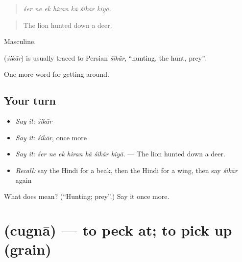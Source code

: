 \begin{quote}
      
\end{quote}

\begin{quote}
\emph{śer ne ek hiran kā śikār kiyā.}
\end{quote}

\begin{quote}
The lion hunted down a deer.
\end{quote}

Masculine.

\begin{cousinweb}
\textbf{} (\emph{śikār}) is usually traced to Persian \emph{šikār}, \textquotedblleft{}hunting, the hunt, prey\textquotedblright{}.
\end{cousinweb}

\begin{grammarlens}[title={What you've built}]
One more word for getting around.
\end{grammarlens}

\subsection*{Your turn}
\begin{itemize}
\raggedright
  \item \emph{Say it:} \emph{śikār}
  \item \emph{Say it:} \emph{śikār}, once more
  \item \emph{Say it:} \emph{śer ne ek hiran kā śikār kiyā.} — The lion hunted down a deer.
  \item \emph{Recall:} say the Hindi for a beak, then the Hindi for a wing, then say \emph{śikār} again
\end{itemize}

\begin{tcolorbox}[breakable,colback=teal!4,colframe=teal!35!black,title={Before you move on}]
What does  mean? (\textquotedblleft{}Hunting; prey\textquotedblright{}.) Say it once more.
\end{tcolorbox}
\section[\texorpdfstring{\hi{चुगना} (cugnā)}{चुगना (cugnā)}]{ (cugnā) — to peck at; to pick up (grain)}

\label{lesson:HI-C448-cugna}



